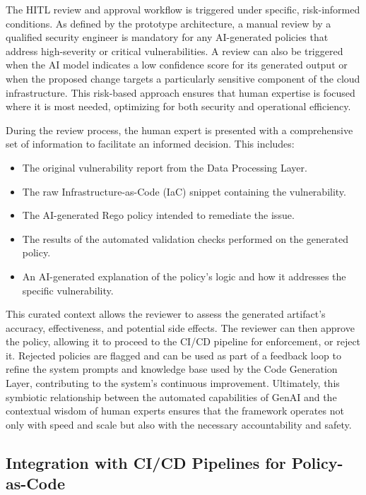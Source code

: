 The HITL review and approval workflow is triggered under specific, risk-informed conditions. As defined by the prototype architecture, a manual review by a qualified security engineer is mandatory for any AI-generated policies that address high-severity or critical vulnerabilities. A review can also be triggered when the AI model indicates a low confidence score for its generated output or when the proposed change targets a particularly sensitive component of the cloud infrastructure. This risk-based approach ensures that human expertise is focused where it is most needed, optimizing for both security and operational efficiency.

During the review process, the human expert is presented with a comprehensive set of information to facilitate an informed decision. This includes:

\begin{itemize}
    \item The original vulnerability report from the Data Processing Layer.
    \item The raw Infrastructure-as-Code (IaC) snippet containing the vulnerability.
    \item The AI-generated Rego policy intended to remediate the issue.
    \item The results of the automated validation checks performed on the generated policy.
    \item An AI-generated explanation of the policy's logic and how it addresses the specific vulnerability.
\end{itemize}

This curated context allows the reviewer to assess the generated artifact's accuracy, effectiveness, and potential side effects. The reviewer can then approve the policy, allowing it to proceed to the CI/CD pipeline for enforcement, or reject it. Rejected policies are flagged and can be used as part of a feedback loop to refine the system prompts and knowledge base used by the Code Generation Layer, contributing to the system's continuous improvement\cite{zanzotto_human---loop_2019, wu_survey_2022}. Ultimately, this symbiotic relationship between the automated capabilities of GenAI and the contextual wisdom of human experts ensures that the framework operates not only with speed and scale but also with the necessary accountability and safety.


\subsection{Integration with CI/CD Pipelines for Policy-as-Code} %
\label{sec:Integration with CI/CD Pipelines for Policy-as-Code}

